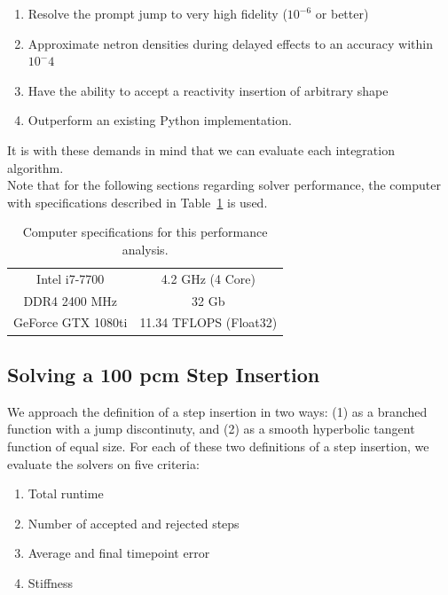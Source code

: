 \documentclass[review,onefignum,onetabnum]{siamart171218}
\begin{document}
\begin{enumerate}
  \item Resolve the prompt jump to very high fidelity ($10^{-6}$ or better)
  \item Approximate netron densities during delayed effects to an accuracy within $10^-4$
  \item Have the ability to accept a reactivity insertion of arbitrary shape
  \item Outperform an existing Python implementation.
\end{enumerate}

It is with these demands in mind that we can evaluate each integration algorithm.\\

Note that for the following sections regarding solver performance, the computer
with specifications described in Table~\cref{tab:computer-specs} is used.

\begin{table}[htb]
  \begin{center}
    \begin{tabular}{c|c}
      Intel i7-7700&4.2 GHz (4 Core)\\
      DDR4 2400 MHz&32 Gb\\
      GeForce GTX 1080ti&11.34 TFLOPS (Float32)\\
    \end{tabular}
  \end{center}
  \caption{Computer specifications for this performance analysis.}
  \label{tab:computer-specs}
\end{table}

\subsection{Solving a 100 pcm Step Insertion}

We approach the definition of a step insertion in two ways: (1) as a branched
function with a jump discontinuty, and (2) as a smooth hyperbolic tangent function
of equal size. For each of these two definitions of a step insertion, we
evaluate the solvers on five criteria:

\begin{enumerate}
  \item Total runtime
  \item Number of accepted and rejected steps
  \item Average and final timepoint error
  \item Stiffness
\end{enumerate}
\end{document}
